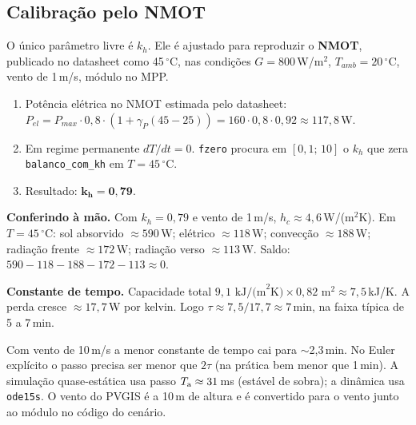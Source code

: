 \subsection{Calibra\c{c}\~ao pelo NMOT}

O \'unico par\^ametro livre \'e $k_h$. Ele \'e ajustado para reproduzir o \textbf{NMOT}, publicado no
datasheet como 45\,$^\circ$C, nas condi\c{c}\~oes $G=800$\,W/m$^2$, $T_{amb}=20\,^\circ$C, vento de
1\,m/s, m\'odulo no MPP.


\begin{logica}
\begin{enumerate}
\item Pot\^encia el\'etrica no NMOT estimada pelo datasheet:
 $P_{el}=P_{max}\cdot0{,}8\cdot(1+\gamma_P(45-25))=160\cdot0{,}8\cdot0{,}92\approx117{,}8$\,W.
\item Em regime permanente $dT/dt=0$. \texttt{fzero} procura em $[0{,}1;\,10]$ o $k_h$ que zera
 \texttt{balanco\_com\_kh} em $T=45\,^\circ$C.
\item Resultado: $\boldsymbol{k_h=0{,}79}$.
\end{enumerate}
\end{logica}

\begin{resultado}
\textbf{Conferindo \`a m\~ao.} Com $k_h=0{,}79$ e vento de 1\,m/s, $h_c\approx4{,}6$\,W/(m$^2$K). Em
$T=45\,^\circ$C: sol absorvido $\approx590$\,W; el\'etrico $\approx118$\,W; convec\c{c}\~ao $\approx188$\,W;
radia\c{c}\~ao frente $\approx172$\,W; radia\c{c}\~ao verso $\approx113$\,W. Saldo:
$590-118-188-172-113\approx0$.

\textbf{Constante de tempo.} Capacidade total $9{,}1\text{ kJ/(m}^2\text{K)}\times0{,}82\text{ m}^2\approx7{,}5$\,kJ/K.
A perda cresce $\approx17{,}7$\,W por kelvin. Logo $\tau\approx7{,}5/17{,}7\approx7$\,min, na faixa t\'ipica de 5 a 7\,min.
\end{resultado}

\begin{atencao}
Com vento de 10\,m/s a menor constante de tempo cai para $\sim$2,3\,min. No Euler expl\'icito o passo
precisa ser menor que $2\tau$ (na pr\'atica bem menor que 1\,min). A simula\c{c}\~ao quase-est\'atica
usa passo $T_{\mathrm{a}}\approx31$\,ms (est\'avel de sobra); a din\^amica usa \texttt{ode15s}. O vento do PVGIS
\'e a 10\,m de altura e \'e convertido para o vento junto ao m\'odulo no c\'odigo do cen\'ario.
\end{atencao}
